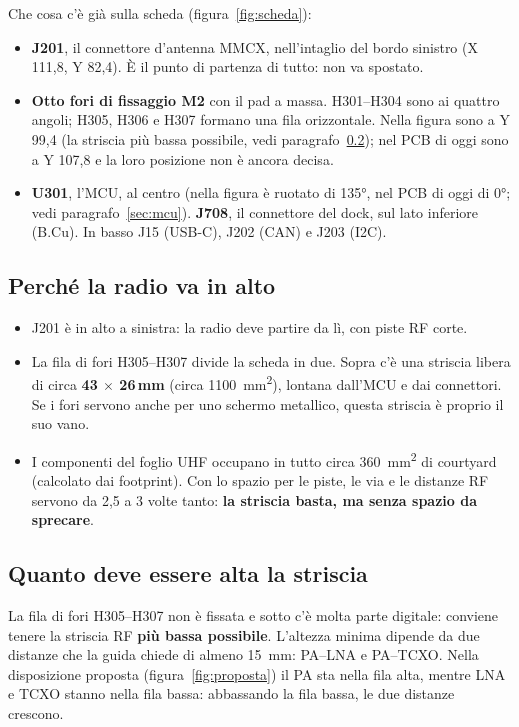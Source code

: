 \documentclass[a4paper,11pt]{article}
\begin{document}
Che cosa c'è già sulla scheda (figura~\ref{fig:scheda}):
\begin{itemize}
\item \textbf{J201}, il connettore d'antenna MMCX, nell'intaglio del bordo sinistro (X 111,8, Y 82,4). È il punto di partenza di tutto: non va spostato.
\item \textbf{Otto fori di fissaggio M2} con il pad a massa. H301--H304 sono ai quattro angoli; H305, H306 e H307 formano una fila orizzontale. Nella figura sono a Y 99,4 (la striscia più bassa possibile, vedi paragrafo~\ref{sec:altezza}); nel PCB di oggi sono a Y 107,8 e la loro posizione non è ancora decisa.
\item \textbf{U301}, l'MCU, al centro (nella figura è ruotato di \ang{135}, nel PCB di oggi di \ang{0}; vedi paragrafo~\ref{sec:mcu}). \textbf{J708}, il connettore del dock, sul lato inferiore (B.Cu). In basso J15 (USB-C), J202 (CAN) e J203 (I2C).
\end{itemize}

\subsection{Perché la radio va in alto}
\begin{itemize}
\item J201 è in alto a sinistra: la radio deve partire da lì, con piste RF corte.
\item La fila di fori H305--H307 divide la scheda in due. Sopra c'è una striscia libera di circa \textbf{43 $\times$ 26\,mm} (circa \SI{1100}{mm^2}), lontana dall'MCU e dai connettori. Se i fori servono anche per uno schermo metallico, questa striscia è proprio il suo vano.
\item I componenti del foglio UHF occupano in tutto circa \SI{360}{mm^2} di courtyard (calcolato dai footprint). Con lo spazio per le piste, le via e le distanze RF servono da 2,5 a 3 volte tanto: \textbf{la striscia basta, ma senza spazio da sprecare}.
\end{itemize}

\subsection{Quanto deve essere alta la striscia}
\label{sec:altezza}
La fila di fori H305--H307 non è fissata e sotto c'è molta parte digitale: conviene tenere la striscia RF \textbf{più bassa possibile}. L'altezza minima dipende da due distanze che la guida chiede di almeno \SI{15}{mm}: PA--LNA e PA--TCXO. Nella disposizione proposta (figura~\ref{fig:proposta}) il PA sta nella fila alta, mentre LNA e TCXO stanno nella fila bassa: abbassando la fila bassa, le due distanze crescono.
\end{document}
